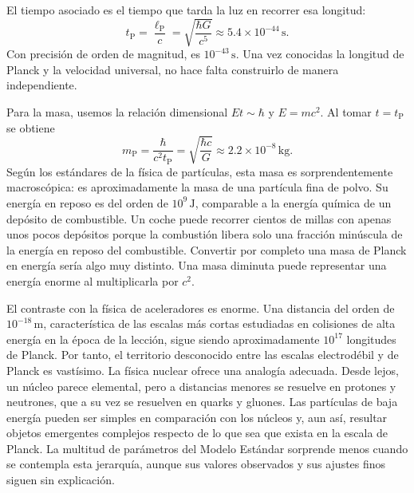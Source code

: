 El tiempo asociado es el tiempo que tarda la luz en recorrer esa longitud:
\begin{equation}
t_{\mathrm P}
=\frac{\ell_{\mathrm P}}{c}
=\sqrt{\frac{\hbar G}{c^5}}
\approx 5.4\times10^{-44}\,\mathrm s.
\label{eq:c10-planck-time}
\end{equation}
Con precisión de orden de magnitud, es \(10^{-43}\,\mathrm s\). Una vez conocidas la longitud de Planck y la velocidad universal, no hace falta construirlo de manera independiente.

Para la masa, usemos la relación dimensional \(Et\sim\hbar\) y \(E=mc^2\). Al tomar \(t=t_{\mathrm P}\) se obtiene
\begin{equation}
m_{\mathrm P}
=\frac{\hbar}{c^2t_{\mathrm P}}
=\sqrt{\frac{\hbar c}{G}}
\approx 2.2\times10^{-8}\,\mathrm{kg}.
\label{eq:c10-planck-mass}
\end{equation}
Según los estándares de la física de partículas, esta masa es sorprendentemente macroscópica: es aproximadamente la masa de una partícula fina de polvo. Su energía en reposo es del orden de \(10^9\,\mathrm J\), comparable a la energía química de un depósito de combustible. Un coche puede recorrer cientos de millas con apenas unos pocos depósitos porque la combustión libera solo una fracción minúscula de la energía en reposo del combustible. Convertir por completo una masa de Planck en energía sería algo muy distinto. Una masa diminuta puede representar una energía enorme al multiplicarla por \(c^2\).

El contraste con la física de aceleradores es enorme. Una distancia del orden de \(10^{-18}\,\mathrm m\), característica de las escalas más cortas estudiadas en colisiones de alta energía en la época de la lección, sigue siendo aproximadamente \(10^{17}\) longitudes de Planck. Por tanto, el territorio desconocido entre las escalas electrodébil y de Planck es vastísimo. La física nuclear ofrece una analogía adecuada. Desde lejos, un núcleo parece elemental, pero a distancias menores se resuelve en protones y neutrones, que a su vez se resuelven en quarks y gluones. Las partículas de baja energía pueden ser simples en comparación con los núcleos y, aun así, resultar objetos emergentes complejos respecto de lo que sea que exista en la escala de Planck. La multitud de parámetros del Modelo Estándar sorprende menos cuando se contempla esta jerarquía, aunque sus valores observados y sus ajustes finos siguen sin explicación.

